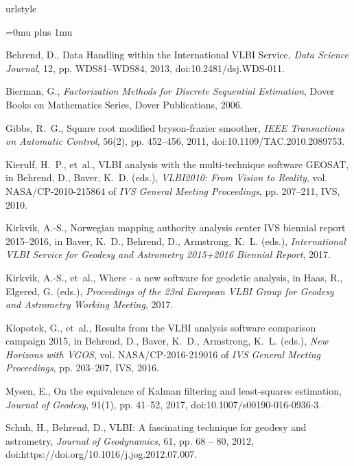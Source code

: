 \documentclass[twocolumn,twoside]{svmultivs_gm} %
\begin{document}
\begin{thebibliography}{99}
\providecommand{\url}[1]{\texttt{#1}}
\providecommand{\urlprefix}{URL }
\expandafter\ifx\csname urlstyle\endcsname\relax
\providecommand{\doi}[1]{doi:\discretionary{}{}{}#1}\else
\providecommand{\doi}{doi:\discretionary{}{}{}\begingroup
\urlstyle{rm}\Url}\fi

\Urlmuskip=0mu plus 1mu\relax

Behrend, D., {Data Handling within the International {VLBI} Service},
\emph{Data Science Journal}, 12, pp. WDS81--WDS84, 2013,
\doi{10.2481/dsj.WDS-011}.

Bierman, G., \emph{Factorization Methods for Discrete Sequential Estimation},
Dover Books on Mathematics Series, Dover Publications, 2006.

Gibbs, R.~G., Square root modified bryson-frazier smoother, \emph{IEEE
Transactions on Automatic Control}, 56(2), pp. 452--456, 2011,
\doi{10.1109/TAC.2010.2089753}.

Kierulf, H.~P., et~al., {VLBI} analysis with the multi-technique software
{GEOSAT}, in Behrend, D., Baver, K.~D. (eds.), \emph{VLBI2010: From Vision to
Reality}, vol. NASA/CP-2010-215864 of \emph{IVS General Meeting Proceedings},
pp. 207--211, IVS, 2010.

Kirkvik, A.-S., Norwegian mapping authority analysis center {IVS} biennial
report 2015--2016, in Baver, K.~D., Behrend, D., Armstrong, K.~L. (eds.),
\emph{International VLBI Service for Geodesy and Astrometry 2015+2016
Biennial Report}, 2017.

Kirkvik, A.-S., et~al., Where - a new software for geodetic analysis, in Haas,
R., Elgered, G. (eds.), \emph{Proceedings of the 23rd European VLBI Group for
Geodesy and Astrometry Working Meeting}, 2017.

Klopotek, G., et~al., Results from the {VLBI} analysis software comparison
campaign 2015, in Behrend, D., Baver, K.~D., Armstrong, K.~L. (eds.),
\emph{New Horizons with VGOS}, vol. NASA/CP-2016-219016 of \emph{IVS General
Meeting Proceedings}, pp. 203--207, IVS, 2016.

Mysen, E., On the equivalence of {K}alman filtering and least-squares
estimation, \emph{Journal of Geodesy}, 91(1), pp. 41--52, 2017,
\doi{10.1007/s00190-016-0936-3}.

Schuh, H., Behrend, D., {VLBI}: A fascinating technique for geodesy and
astrometry, \emph{Journal of Geodynamics}, 61, pp. 68 -- 80, 2012,
\doi{https://doi.org/10.1016/j.jog.2012.07.007}.

\end{thebibliography}
\end{document}

